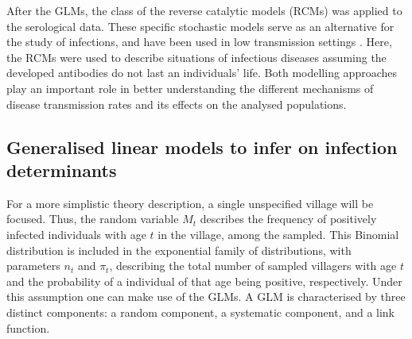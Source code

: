 After the GLMs, the class of the reverse catalytic models (RCMs) was applied to the serological data.
These specific stochastic models serve as an alternative for the study of infections, and have been used in low transmission settings \cite{corran2007serology}.
Here, the RCMs were used to describe situations of infectious diseases assuming the developed antibodies do not last an individuals' life.
Both modelling approaches play an important role in better understanding the different mechanisms of disease transmission rates and its effects on the analysed populations.



\subsection{Generalised linear models to infer on infection determinants}

For a more simplistic theory description, a single unspecified village will be focused.
Thus, the random variable $M_t$ describes the frequency of positively infected individuals with age $t$ in the village, among the sampled.
This Binomial distribution is included in the exponential family of distributions, with parameters $n_t$ and $\pi_t$, describing the total number of sampled villagers with age $t$ and the probability of a individual of that age being positive, respectively.
Under this assumption one can make use of the GLMs.
A GLM is characterised by three distinct components: a random component, a systematic component, and a link function.

